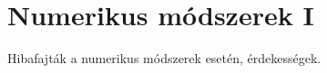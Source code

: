 \documentclass[../../main.tex]{subfiles}
\begin{document}
\section{Numerikus módszerek I}

\begin{fulltheorem}
	Hibafajták a numerikus módszerek esetén, érdekességek.
\end{fulltheorem}
\end{document}

